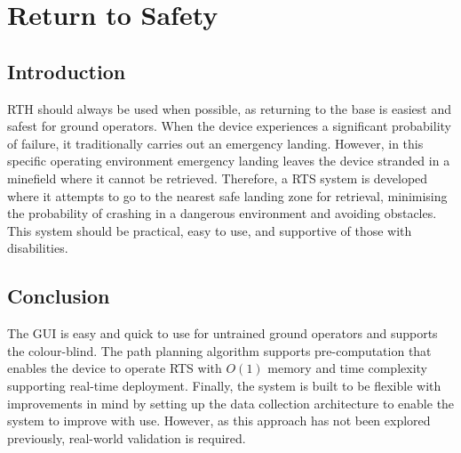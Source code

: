 \newpage
{}
\section{Return to Safety} \label{Return to Safety}

\subsection{Introduction}\label{sub_section:tgt_RTS_intro}
\gls{RTH} should always be used when possible, as returning to the base is easiest and safest for ground operators. When the device experiences a significant probability of failure, it traditionally carries out an emergency landing. However, in this specific operating environment emergency landing leaves the device stranded in a minefield where it cannot be retrieved. Therefore, a \gls{RTS} system is developed where it attempts to go to the nearest safe landing zone for retrieval, minimising the probability of crashing in a dangerous environment and avoiding obstacles. This system should be practical, easy to use, and supportive of those with disabilities.





\subsection{Conclusion}
The \gls{GUI} is easy and quick to use for untrained ground operators and supports the colour-blind. The path planning algorithm supports pre-computation that enables the device to operate \gls{RTS} with $O(1)$ memory and time complexity supporting real-time deployment. Finally, the system is built to be flexible with improvements in mind by setting up the data collection architecture to enable the system to improve with use. However, as this approach has not been explored previously, real-world validation is required.